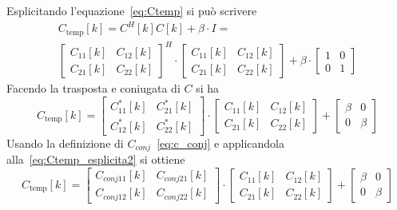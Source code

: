 \documentclass[12pt,a4paper,titlepage]{article}
\begin{document}
Esplicitando l'equazione~\eqref{eq:Ctemp} si può scrivere
\begin{equation}\label{eq:Ctemp_esplicita}
\begin{split}
C_{\text{temp}}[k] = C^H[k] C[k] + \beta \cdot I = \\ 
\begin{bmatrix}
C_{11}[k] & C_{12}[k]\\
C_{21}[k] & C_{22}[k]
\end{bmatrix}^H
\cdot
\begin{bmatrix}
C_{11}[k] & C_{12}[k]\\
C_{21}[k] & C_{22}[k]
\end{bmatrix}
+
\beta \cdot
\begin{bmatrix}
1 & 0\\
0 & 1
\end{bmatrix}
\end{split}
\end{equation}
Facendo la trasposta e coniugata di $C$ si ha
\begin{equation}\label{eq:Ctemp_esplicita2}
C_{\text{temp}}[k] = 
\begin{bmatrix}
C_{11}^*[k] & C_{21}^*[k]\\
C_{12}^*[k] & C_{22}^*[k]
\end{bmatrix}
\cdot
\begin{bmatrix}
C_{11}[k] & C_{12}[k]\\
C_{21}[k] & C_{22}[k]
\end{bmatrix}
+
\begin{bmatrix}
\beta & 0\\
0 & \beta
\end{bmatrix}
\end{equation}
Usando la definizione di $C_{conj}$~\eqref{eq:c_conj} e applicandola alla~\eqref{eq:Ctemp_esplicita2} si ottiene
\begin{equation}\label{eq:Ctemp_esplicita3}
C_{\text{temp}}[k] = 
\begin{bmatrix}
C_{conj11}[k] & C_{conj21}[k]\\
C_{conj12}[k] & C_{conj22}[k]
\end{bmatrix}
\cdot
\begin{bmatrix}
C_{11}[k] & C_{12}[k]\\
C_{21}[k] & C_{22}[k]
\end{bmatrix}
+
\begin{bmatrix}
\beta & 0\\
0 & \beta
\end{bmatrix}
\end{equation}
\end{document}
